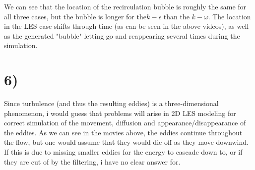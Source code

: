 \documentclass[a4paper,english,12pt,twoside]{article}
\begin{document}
\newpage
We can see that the location of the recirculation bubble is roughly the same for all three cases, but the bubble is longer for the$k-\epsilon$ than the $k-\omega$. The location in the LES case shifts through time (as can be seen in the above videos), as well as the generated "bubble" letting go and reappearing several times during the simulation. 
\section*{6)}
Since turbulence (and thus the resulting eddies) is a three-dimensional phenomenon, i would guess that problems will arise in 2D LES modeling for correct simulation of the movement, diffusion and appearance/disappearance of the eddies. As we can see in the movies above, the eddies continue throughout the flow, but one would assume that they would die off as they move downwind. If this is due to missing smaller eddies for the energy to cascade down to, or if they are cut of by the filtering, i have no clear answer for.
 
\end{document}
